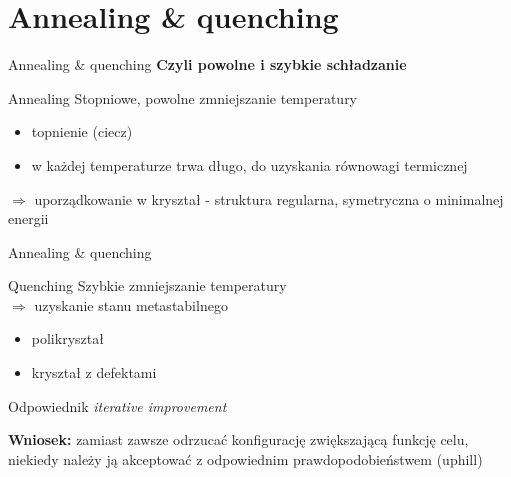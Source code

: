 \section{Annealing \& quenching}


	\begin{frame}{Annealing \& quenching}
		\textbf{Czyli powolne i szybkie schładzanie}
		\begin{block}{Annealing}
			Stopniowe, powolne zmniejszanie temperatury
			\begin{itemize}
				\item topnienie (ciecz)
				\item w każdej temperaturze trwa długo, do uzyskania równowagi termicznej
			\end{itemize}
			$\Rightarrow$ uporządkowanie w kryształ - struktura regularna, symetryczna o minimalnej energii
		\end{block}
	\end{frame}


	\begin{frame}{Annealing \& quenching}
		\begin{block}{Quenching}
			Szybkie zmniejszanie temperatury \\
			$\Rightarrow$ uzyskanie stanu metastabilnego
			\begin{itemize}
				\item polikryształ
				\item kryształ z defektami
			\end{itemize}
			Odpowiednik \textit{iterative improvement}
		\end{block}
		\textbf{Wniosek:} zamiast zawsze odrzucać konfigurację zwiększającą funkcję celu, niekiedy należy ją akceptować z odpowiednim prawdopodobieństwem (uphill)
	\end{frame}
